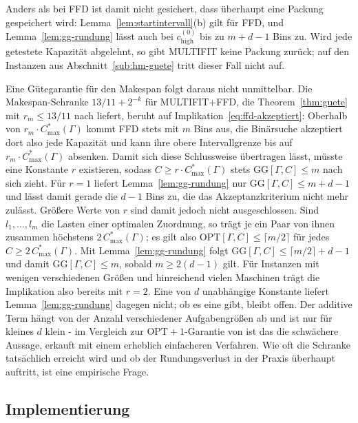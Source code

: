 Anders als bei FFD ist damit nicht gesichert, dass überhaupt eine Packung gespeichert wird:
Lemma~\ref{lem:startintervall}(b) gilt für FFD, und Lemma~\ref{lem:gg-rundung} lässt auch bei
$c_{\mathrm{high}}^{(0)}$ bis zu $m + d - 1$ Bins zu.
Wird jede getestete Kapazität abgelehnt, so gibt MULTIFIT keine Packung zurück; auf den
Instanzen aus Abschnitt~\ref{sub:hm-guete} tritt dieser Fall nicht auf.

Eine Gütegarantie für den Makespan folgt daraus nicht unmittelbar.
Die Makespan-Schranke $13/11 + 2^{-k}$ für MULTIFIT+FFD, die Theorem~\ref{thm:guete} mit
$r_m \le 13/11$ nach \textcite{cao1995} liefert, beruht auf
Implikation~\eqref{eq:ffd-akzeptiert}: Oberhalb von $r_m \cdot C^{*}_{\max}(\Gamma)$ kommt FFD
stets mit $m$ Bins aus, die Binärsuche akzeptiert dort also jede Kapazität und kann ihre obere
Intervallgrenze bis auf $r_m \cdot C^{*}_{\max}(\Gamma)$ absenken.
Damit sich diese Schlussweise übertragen lässt, müsste eine Konstante $r$ existieren, sodass
$C \ge r \cdot C^{*}_{\max}(\Gamma)$ stets $\mathrm{GG}[\Gamma, C] \le m$ nach sich zieht.
Für $r = 1$ liefert Lemma~\ref{lem:gg-rundung} nur $\mathrm{GG}[\Gamma, C] \le m + d - 1$ und
lässt damit gerade die $d-1$ Bins zu, die das Akzeptanzkriterium nicht mehr zulässt.
Größere Werte von $r$ sind damit jedoch nicht ausgeschlossen.
Sind $l_1, \ldots, l_m$ die Lasten einer optimalen Zuordnung, so trägt je ein Paar von ihnen
zusammen höchstens $2\,C^{*}_{\max}(\Gamma)$; es gilt also
$\mathrm{OPT}[\Gamma, C] \le \lceil m/2 \rceil$ für jedes $C \ge 2\,C^{*}_{\max}(\Gamma)$.
Mit Lemma~\ref{lem:gg-rundung} folgt $\mathrm{GG}[\Gamma, C] \le \lceil m/2 \rceil + d - 1$
und damit $\mathrm{GG}[\Gamma, C] \le m$, sobald $m \ge 2(d-1)$ gilt.
Für Instanzen mit wenigen verschiedenen Größen und hinreichend vielen Maschinen trägt die
Implikation also bereits mit $r = 2$.
Eine von $d$ unabhängige Konstante liefert Lemma~\ref{lem:gg-rundung} dagegen nicht; ob es
eine gibt, bleibt offen.
Der additive Term hängt von der Anzahl verschiedener Aufgabengrößen ab und ist nur für kleines $d$
klein - im Vergleich zur $\mathrm{OPT}+1$-Garantie von \textcite{jansen_solisoba2010} ist das
die schwächere Aussage, erkauft mit einem erheblich einfacheren Verfahren.
Wie oft die Schranke tatsächlich erreicht wird und ob der Rundungsverlust in der Praxis überhaupt
auftritt, ist eine empirische Frage.

\subsection{Implementierung}
\label{sub:gg-implementierung}

